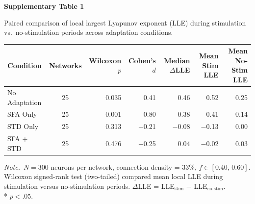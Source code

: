\documentclass[11pt]{article}
\begin{document}
\begin{center}
{\large\bfseries Supplementary Table 1}
\end{center}

\medskip
\noindent
Paired comparison of local largest Lyapunov exponent (LLE) during stimulation vs.\ no-stimulation periods across adaptation conditions.

\bigskip

\begin{table}[h]
\centering
\begin{tabular}{l c r r r r r}
\toprule
Condition & Networks & Wilcoxon $p$ & Cohen's $d$ & Median $\Delta$LLE & Mean Stim LLE & Mean No-Stim LLE \\
\midrule
No Adaptation & 25 & 0.035\rlap{*}  &  0.41 &  0.46 &  0.52 & 0.25 \\
SFA Only       & 25 & 0.001\rlap{*}  &  0.80 &  0.38 &  0.41 & 0.14 \\
STD Only       & 25 & 0.313   & $-$0.21 & $-$0.08 & $-$0.13 & 0.00 \\
SFA + STD      & 25 & 0.476   & $-$0.25 &  0.04 & $-$0.02 & 0.03 \\
\bottomrule
\end{tabular}
\end{table}

\smallskip
\noindent
\textit{Note.}\ $N = 300$ neurons per network, connection density = 33\%, $f \in [0.40,\, 0.60]$.
Wilcoxon signed-rank test (two-tailed) compared mean local LLE during stimulation
versus no-stimulation periods.
$\Delta$LLE = LLE$_{\text{stim}}$ $-$ LLE$_{\text{no-stim}}$.\\[2pt]
* $p < .05$.
\end{document}
